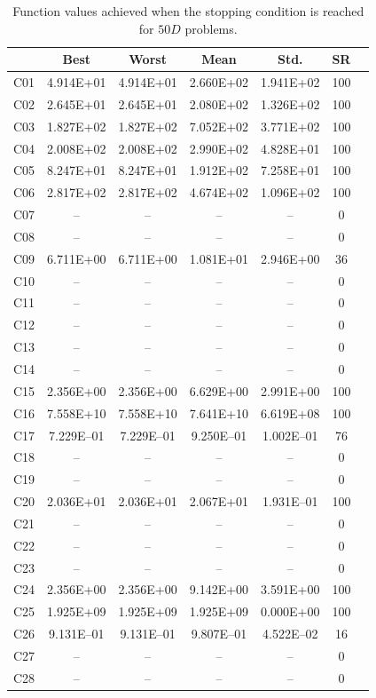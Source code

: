 \documentclass[conference]{IEEEtran}
\begin{document}
% 
% 
% 
\begin{table}[!ht]
	\caption{Function values achieved when the stopping condition is reached for $50D$ problems.}
	\centering
	\begin{tabular}{|c|c|c|c|c|c|c|}
	\hline
     & Best & Worst & Mean & Std. & SR \\ \hline \hline
C01 & 4.914E+01 & 4.914E+01 & 2.660E+02 & 1.941E+02 &  100 \\ 
C02 & 2.645E+01 & 2.645E+01 & 2.080E+02 & 1.326E+02 &  100 \\ 
C03 & 1.827E+02 & 1.827E+02 & 7.052E+02 & 3.771E+02 &  100 \\ 
C04 & 2.008E+02 & 2.008E+02 & 2.990E+02 & 4.828E+01 &  100 \\ 
C05 & 8.247E+01 & 8.247E+01 & 1.912E+02 & 7.258E+01 &  100 \\ 
C06 & 2.817E+02 & 2.817E+02 & 4.674E+02 & 1.096E+02 &  100 \\ 
C07 &  -- &  -- &  -- &  -- &    0 \\ 
C08 &  -- &  -- &  -- &  -- &    0 \\ 
C09 & 6.711E+00 & 6.711E+00 & 1.081E+01 & 2.946E+00 &   36 \\ 
C10 &  -- &  -- &  -- &  -- &    0 \\ 
C11 &  -- &  -- &  -- &  -- &    0 \\ 
C12 &  -- &  -- &  -- &  -- &    0 \\ 
C13 &  -- &  -- &  -- &  -- &    0 \\ 
C14 &  -- &  -- &  -- &  -- &    0 \\ 
C15 & 2.356E+00 & 2.356E+00 & 6.629E+00 & 2.991E+00 &  100 \\ 
C16 & 7.558E+10 & 7.558E+10 & 7.641E+10 & 6.619E+08 &  100 \\ 
C17 & 7.229E--01 & 7.229E--01 & 9.250E--01 & 1.002E--01 &   76 \\ 
C18 &  -- &  -- &  -- &  -- &    0 \\ 
C19 &  -- &  -- &  -- &  -- &    0 \\ 
C20 & 2.036E+01 & 2.036E+01 & 2.067E+01 & 1.931E--01 &  100 \\ 
C21 &  -- &  -- &  -- &  -- &    0 \\ 
C22 &  -- &  -- &  -- &  -- &    0 \\ 
C23 &  -- &  -- &  -- &  -- &    0 \\ 
C24 & 2.356E+00 & 2.356E+00 & 9.142E+00 & 3.591E+00 &  100 \\ 
C25 & 1.925E+09 & 1.925E+09 & 1.925E+09 & 0.000E+00 &  100 \\ 
C26 & 9.131E--01 & 9.131E--01 & 9.807E--01 & 4.522E--02 &   16 \\ 
C27 &  -- &  -- &  -- &  -- &    0 \\ 
C28 &  -- &  -- &  -- &  -- &    0 \\ 
\hline
	\end{tabular}
	\label{tab:d50}
\end{table}
\end{document}
